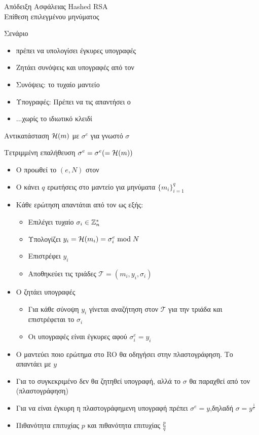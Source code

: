 \documentclass{beamer}
\begin{document}
\begin{frame}[allowframebreaks]{Απόδειξη Ασφάλειας Hashed RSA \\ Επίθεση επιλεγμένου μηνύματος} 

\begin{block}{Σενάριο}
\begin{itemize}
\item \adv πρέπει να υπολογίσει έγκυρες υπογραφές
\item Ζητάει συνόψεις και υπογραφές από τον \advb
\item Συνόψεις: το τυχαίο μαντείο
\item Υπογραφές: Πρέπει να τις απαντήσει ο \advb
\item ...χωρίς το ιδιωτικό κλειδί
\end{itemize}
\end{block}


Αντικατάσταση $\mathcal{H} (m)$ με $\sigma^e$ για γνωστό $\sigma$

Τετριμμένη επαλήθευση $\sigma^e = \sigma^e (=\mathcal{H}(m))$



\framebreak
\begin{itemize}
\item Ο \advb προωθεί το $(e,N)$ στον \adv
\item O \adv κάνει $q$ ερωτήσεις στο μαντείο για μηνύματα $\{m_i\}_{i=1}^q$
\item Κάθε ερώτηση απαντάται από τον \advb ως εξής:
\begin{itemize}
\item Επιλέγει τυχαίο $\sigma_i \in \mathbb{Z}^*_n$
\item Υπολογίζει $y_i = \mathcal{H}(m_i) = \sigma_i^e \bmod N$
\item Επιστρέφει $y_i$
\item Aποθηκεύει τις  τριάδες $\mathcal{T} = (m_i, y_i, \sigma_i)$
\end{itemize}

\item O \adv ζητάει υπογραφές
\begin{itemize}
\item Για κάθε σύνοψη $y_i$ γίνεται αναζήτηση στον $\mathcal{T}$ για την τριάδα και επιστρέφεται το $\sigma_i$
\item Οι υπογραφές είναι έγκυρες αφού $\sigma_i^e = y_i$
\end{itemize}
\item Ο \advb μαντεύει ποιο ερώτημα στο RO θα οδηγήσει στην πλαστογράφηση.  Το απαντάει με $y$
\item Για το συγκεκριμένο δεν θα ζητηθεί υπογραφή, αλλά το $\sigma$ θα παραχθεί από τον \adv (πλαστογράφηση)
\item Για να είναι έγκυρη η πλαστογράφημενη υπογραφή πρέπει $\sigma^e = y$,δηλαδή $\sigma=y^\frac{1}{e}$
\item Πιθανότητα επιτυχίας \adv $p$ και πιθανότητα επιτυχίας \advb $\frac{p}{q}$
\end{itemize}


\end{frame}
\end{document}
